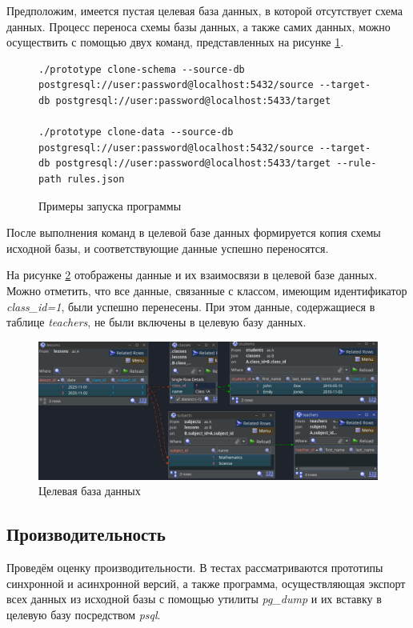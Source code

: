 Предположим, имеется пустая целевая база данных, в которой отсутствует схема данных. Процесс переноса схемы базы данных, а также самих данных, можно осуществить с помощью двух команд, представленных на рисунке \ref{prototype-execute-example}.

\begin{figure}
  \begin{lstlisting}
./prototype clone-schema --source-db postgresql://user:password@localhost:5432/source --target-db postgresql://user:password@localhost:5433/target

./prototype clone-data --source-db postgresql://user:password@localhost:5432/source --target-db postgresql://user:password@localhost:5433/target --rule-path rules.json
  \end{lstlisting}
  \caption{Примеры запуска программы}
  \label{prototype-execute-example}
\end{figure}

После выполнения команд в целевой базе данных формируется копия схемы исходной базы, и соответствующие данные успешно переносятся.

На рисунке \ref{target-db} отображены данные и их взаимосвязи в целевой базе данных. Можно отметить, что все данные, связанные с классом, имеющим идентификатор \textit{class\_id=1}, были успешно перенесены. При этом данные, содержащиеся в таблице \textit{teachers}, не были включены в целевую базу данных.

\begin{figure}
  \includegraphics[scale=0.5]{./img/jailer-target-db-overview.png}
  \caption{Целевая база данных}
  \label{target-db}
\end{figure}

\subsection{Производительность}

Проведём оценку производительности. В тестах рассматриваются прототипы синхронной и асинхронной версий, а также программа, осуществляющая экспорт всех данных из исходной базы с помощью утилиты \textit{pg\_dump} и их вставку в целевую базу посредством \textit{psql}.

